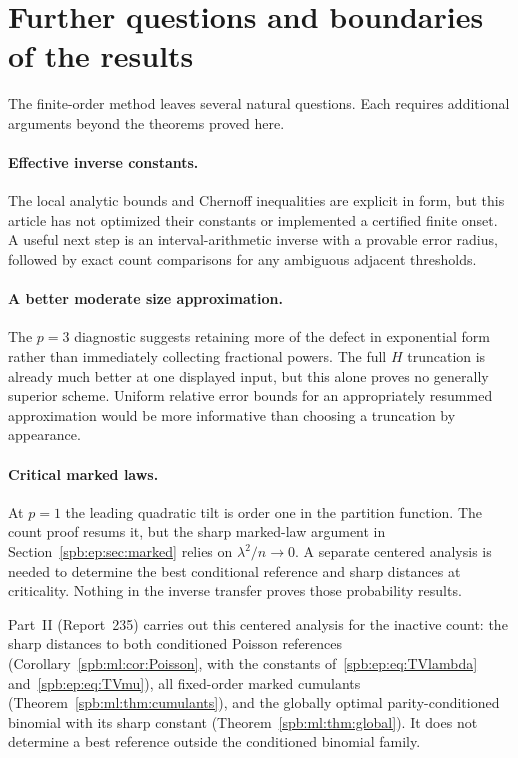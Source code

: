 \section{Further questions and boundaries of the results}
The finite-order method leaves several natural questions. Each requires
additional arguments beyond the theorems proved here.

\paragraph{Effective inverse constants.}
The local analytic bounds and Chernoff inequalities are explicit in form,
but this article has not optimized their constants or implemented a certified
finite onset. A useful next step is an interval-arithmetic inverse with a
provable error radius, followed by exact count comparisons for any
ambiguous adjacent thresholds.

\paragraph{A better moderate size approximation.}
The $p=3$ diagnostic suggests retaining more of the defect in exponential
form rather than immediately collecting fractional powers. The full
$H$ truncation is already much better at one displayed input, but this
alone proves no generally superior scheme. Uniform relative error bounds
for an appropriately resummed approximation would be more informative
than choosing a truncation by appearance.

\paragraph{Critical marked laws.}
At $p=1$ the leading quadratic tilt is order one in the partition function.
The count proof resums it, but the sharp marked-law argument in
Section~\ref{spb:ep:sec:marked} relies on $\lambda^2/n\to0$.
A separate centered analysis is needed to determine the best conditional
reference and sharp distances at criticality. Nothing in the inverse
transfer proves those probability results.
\begin{writenote}
Part~II (Report~235) carries out this centered analysis for the inactive
count: the sharp distances to both conditioned Poisson references
(Corollary~\ref{spb:ml:cor:Poisson}, with the constants of~\eqref{spb:ep:eq:TVlambda}
and~\eqref{spb:ep:eq:TVmu}), all fixed-order marked cumulants
(Theorem~\ref{spb:ml:thm:cumulants}), and the globally optimal
parity-conditioned binomial with its sharp constant
(Theorem~\ref{spb:ml:thm:global}). It does not determine a best reference
outside the conditioned binomial family.
\end{writenote}

